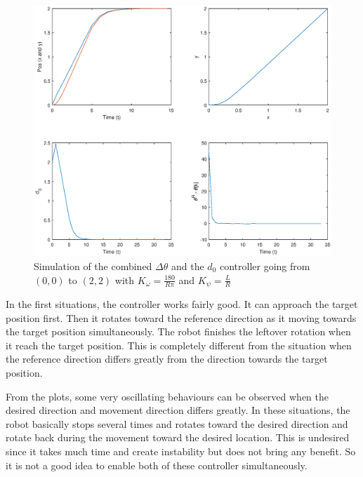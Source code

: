 \begin{figure}[H]
    \includegraphics[width=\textwidth]{figs/perf-d0-theta.eps}
    \caption{Simulation of the combined $\Delta \theta$ and the $d_0$  controller going from $(0, 0)$ to $(2, 2)$ with $K_\omega= \frac{180}{R \pi}$ and $K_\psi= \frac{L}{R}$  }\label{fig:02180}
\end{figure}

In the first situations, the controller works fairly good. It can approach the target position first. Then it rotates toward the reference direction as it moving towards the target position simultaneously. The robot finishes the leftover rotation when it reach the target position. This is completely different from the situation when the reference direction differs greatly from the direction towards the target position. 

From the plots, some very oscillating behaviours can be observed when the desired direction and movement direction differs greatly. In these situations, the robot basically stops several times and rotates toward the desired direction and rotate back during the movement toward the desired location. This is undesired since it takes much time and create instability but does not bring any benefit. So it is not a good idea to enable both of these controller simultaneously. 